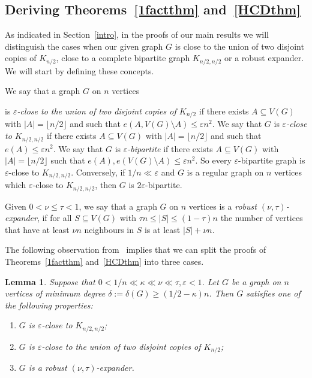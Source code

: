 \documentclass{memo-l}
\newtheorem{lemma}[firstthm]{Lemma}
\def\COMMENT#1{}
\def\eps{\varepsilon}
\numberwithin{section}{chapter}
\numberwithin{equation}{section}
\numberwithin{firstthm}{section}
\numberwithin{figure}{section}
\begin{document}
\subsection{Deriving Theorems~\ref{1factthm} and~\ref{HCDthm}}

As indicated in Section~\ref{intro}, in the proofs of our main results
we will distinguish the cases when our given graph $G$ is close to the union of two disjoint copies of $K_{n/2}$,
close to a complete bipartite graph $K_{n/2,n/2}$ or a robust expander. We will start by defining these concepts.

We say that a graph $G$ on $n$ vertices%
   \COMMENT{Daniela}
is \emph{$\eps$-close to the union of two disjoint copies of $K_{n/2}$}
if there exists $A\subseteq V(G)$ with $|A|=\lfloor n/2\rfloor$ and such that $e(A,V(G)\setminus A)\le\eps n^{2}$.
We say that $G$ is \emph{$\eps$-close to $K_{n/2,n/2}$} if there exists $A\subseteq V(G)$ with $|A|=\lfloor n/2\rfloor$
and such that $e(A)\le \eps n^{2}$. We say that $G$ is \emph{$\eps$-bipartite} if there exists $A\subseteq V(G)$ with $|A|=\lfloor n/2\rfloor$
such that $e(A), e(V(G)\setminus A) \le \eps n^{2}$. So every $\eps$-bipartite graph is $\eps$-close to $K_{n/2,n/2}$.
Conversely, if $1/n\ll \eps$ and $G$ is a regular graph on $n$ vertices which
$\eps$-close to $K_{n/2,n/2}$, then $G$ is $2\eps$-bipartite.

Given $0<\nu \leq \tau<1$, we say that a graph $G$ on $n$ vertices is a \emph{robust $(\nu, \tau)$-expander},
if for all $S\subseteq V(G)$ with $\tau n\le |S|\le (1-\tau)n$ the number of vertices that have at least $\nu n$
neighbours in $S$ is at least $|S|+\nu n$. 

The following observation from~\cite{KLOmindeg} implies that we can split the proofs of Theorems~\ref{1factthm} and~\ref{HCDthm}
into three cases.

\begin{lemma}\label{lem:characteriseexpanders}
Suppose that $0<1/n\ll\kappa\ll\nu\ll\tau,\eps<1$.
Let $G$ be a graph on $n$ vertices of minimum degree $\delta:=\delta(G)\ge(1/2-\kappa)n$.
Then $G$ satisfies one of the following properties:
\begin{enumerate}
\item[{\rm (i)}] $G$ is $\eps$-close to $K_{n/2,n/2}$;
\item[{\rm (ii)}] $G$ is $\eps$-close to the union of two disjoint copies of $K_{n/2}$;
\item[{\rm (iii)}] $G$ is a robust $(\nu,\tau)$-expander.
\end{enumerate}
\end{lemma}
\end{document}
